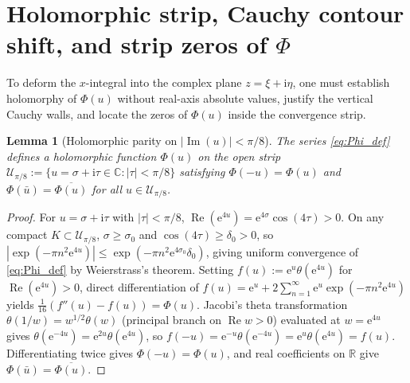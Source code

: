 \documentclass[11pt,a4paper,reqno]{amsart}
\newtheorem{lemma}[theorem]{Lemma}
\theoremstyle{definition}
\theoremstyle{remark}
\numberwithin{equation}{section}
\newcommand{\ii}{\mathrm{i}}
\newcommand{\ee}{\mathrm{e}}
\newcommand{\Rea}{\operatorname{Re}}
\newcommand{\Ima}{\operatorname{Im}}
\begin{document}
\section{Holomorphic strip, Cauchy contour shift, and strip zeros of $\Phi$}\label{sec:holomorphic}

To deform the $x$-integral into the complex plane $z = \xi + \ii\eta$, one must establish holomorphy of $\Phi(u)$ without real-axis absolute values, justify the vertical Cauchy walls, and locate the zeros of $\Phi(u)$ inside the convergence strip.

\begin{lemma}[Holomorphic parity on $|\Ima(u)| < \pi/8$]\label{lem:holo_parity}
The series \eqref{eq:Phi_def} defines a holomorphic function $\Phi(u)$ on the open strip $\mathcal{U}_{\pi/8} := \{u = \sigma + \ii\tau \in \mathbb{C} : |\tau| < \pi/8\}$ satisfying $\Phi(-u) = \Phi(u)$ and $\Phi(\bar{u}) = \overline{\Phi(u)}$ for all $u \in \mathcal{U}_{\pi/8}$.
\end{lemma}

\begin{proof}
For $u = \sigma + \ii\tau$ with $|\tau| < \pi/8$, $\Rea(\ee^{4u}) = \ee^{4\sigma}\cos(4\tau) > 0$. On any compact $K \subset \mathcal{U}_{\pi/8}$, $\sigma \ge \sigma_0$ and $\cos(4\tau) \ge \delta_0 > 0$, so $|\exp(-\pi n^2\ee^{4u})| \le \exp(-\pi n^2\ee^{4\sigma_0}\delta_0)$, giving uniform convergence of \eqref{eq:Phi_def} by Weierstrass's theorem. Setting $f(u) := \ee^u\theta(\ee^{4u})$ for $\Rea(\ee^{4u}) > 0$, direct differentiation of $f(u) = \ee^u + 2\sum_{n=1}^\infty \ee^u\exp(-\pi n^2\ee^{4u})$ yields $\frac{1}{16}(f''(u) - f(u)) = \Phi(u)$. Jacobi's theta transformation $\theta(1/w) = w^{1/2}\theta(w)$ (principal branch on $\Rea w > 0$) evaluated at $w = \ee^{4u}$ gives $\theta(\ee^{-4u}) = \ee^{2u}\theta(\ee^{4u})$, so $f(-u) = \ee^{-u}\theta(\ee^{-4u}) = \ee^u\theta(\ee^{4u}) = f(u)$. Differentiating twice gives $\Phi(-u) = \Phi(u)$, and real coefficients on $\mathbb{R}$ give $\Phi(\bar{u}) = \overline{\Phi(u)}$.
\end{proof}
\end{document}
